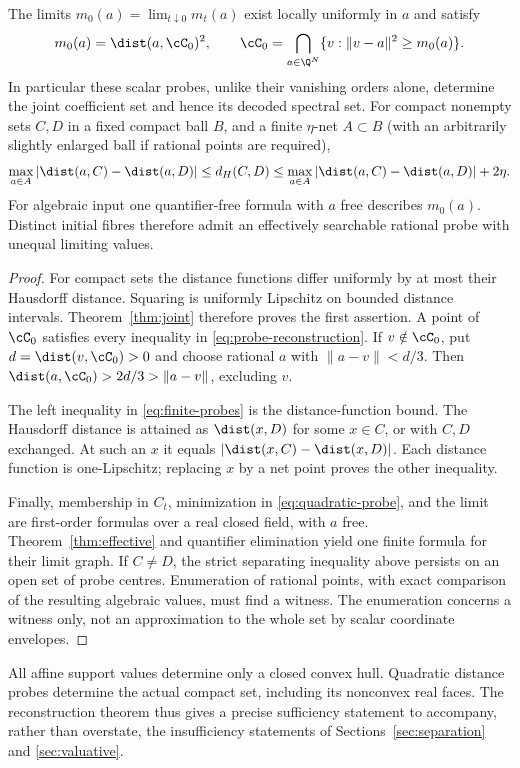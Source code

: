 \begin{theorem}\label{thm:reconstruction}
The limits $m_0(a)=\lim_{t\downarrow0}m_t(a)$ exist locally uniformly
in $a$ and satisfy
\begin{equation}\label{eq:probe-reconstruction}
 m_0(a)=\dist(a,\cC_0)^2,\qquad
 \cC_0=\bigcap_{a\in\Q^N}
           \{v:\|v-a\|^2\ge m_0(a)\}.
\end{equation}
In particular these scalar probes, unlike their vanishing orders alone,
determine the joint coefficient set and hence its decoded spectral set.
For compact nonempty sets $C,D$ in a fixed compact ball $B$, and a finite
$\eta$-net $A\subset B$ (with an arbitrarily slightly enlarged ball if
rational points are required),
\begin{equation}\label{eq:finite-probes}
 \max_{a\in A}|\dist(a,C)-\dist(a,D)|
 \le d_H(C,D)
 \le \max_{a\in A}|\dist(a,C)-\dist(a,D)|+2\eta.
\end{equation}
For algebraic input one quantifier-free formula with $a$ free describes
$m_0(a)$. Distinct initial fibres therefore admit an effectively
searchable rational probe with unequal limiting values.
\end{theorem}
\begin{proof}
For compact sets the distance functions differ uniformly by at most their
Hausdorff distance. Squaring is uniformly Lipschitz on bounded distance
intervals. Theorem~\ref{thm:joint} therefore proves the first assertion.
A point of $\cC_0$ satisfies every inequality in
\eqref{eq:probe-reconstruction}. If $v\notin\cC_0$, put
$d=\dist(v,\cC_0)>0$ and choose rational $a$ with $\|a-v\|<d/3$.
Then $\dist(a,\cC_0)>2d/3>\|a-v\|$, excluding $v$.

The left inequality in \eqref{eq:finite-probes} is the distance-function
bound. The Hausdorff distance is attained as $\dist(x,D)$ for some
$x\in C$, or with $C,D$ exchanged. At such an $x$ it equals
$|\dist(x,C)-\dist(x,D)|$. Each distance function is one-Lipschitz;
replacing $x$ by a net point proves the other inequality.

Finally, membership in $C_t$, minimization in
\eqref{eq:quadratic-probe}, and the limit are first-order formulas over
a real closed field, with $a$ free. Theorem~\ref{thm:effective} and
quantifier elimination yield one finite formula for their limit graph.
If $C\ne D$, the strict separating inequality above persists on an open
set of probe centres. Enumeration of rational points, with exact
comparison of the resulting algebraic values, must find a witness.
The enumeration concerns a witness only, not an approximation to the
whole set by scalar coordinate envelopes.
\end{proof}

All affine support values determine only a closed convex hull. Quadratic
distance probes determine the actual compact set, including its
nonconvex real faces. The reconstruction theorem thus gives a precise
sufficiency statement to accompany, rather than overstate, the
insufficiency statements of Sections~\ref{sec:separation} and
\ref{sec:valuative}.
